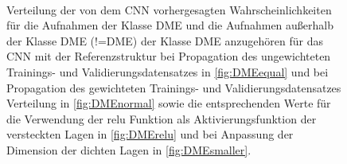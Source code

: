 \begin{figure}
 \centering
  \begin{subfigure}[Ungewichteter Datensatz]{
 \texttt{[image: fig/Appendix\_CNN/DMEornotlogequal.pdf]} \label{fig:DMEequal}}
  \end{subfigure}
 \begin{subfigure}[Gewichteter Datensatz]{
 \texttt{[image: fig/Appendix\_CNN/DMEornotlognormal.pdf]}\label{fig:DMEnormal}}
  \end{subfigure} \\
  \begin{subfigure}[relu statt elu als Aktivierungsfunktion]{
 \texttt{[image: fig/Appendix\_CNN/DMEornotlogrelu.pdf]}\label{fig:DMErelu}}
  \end{subfigure}
 \begin{subfigure}[Verkleinerte Dimensionen der dichten Lagen]{
 \texttt{[image: fig/Appendix\_CNN/DMEornotlogsmaller.pdf]}\label{fig:DMEsmaller}}
  \end{subfigure}
  \caption{Verteilung der von dem CNN vorhergesagten Wahrscheinlichkeiten für die Aufnahmen der Klasse DME und die Aufnahmen außerhalb der Klasse DME (!=DME) der Klasse DME anzugehören für das CNN mit der Referenzstruktur bei Propagation des ungewichteten Trainings- und Validierungsdatensatzes in \ref{fig:DMEequal} und bei Propagation des gewichteten Trainings- und Validierungsdatensatzes Verteilung in \ref{fig:DMEnormal} sowie die entsprechenden Werte für die Verwendung der relu Funktion als Aktivierungsfunktion der versteckten Lagen in \ref{fig:DMErelu} und bei Anpassung der Dimension der dichten Lagen in \ref{fig:DMEsmaller}.}
\end{figure}
\setcounter{subfigure}{0}



